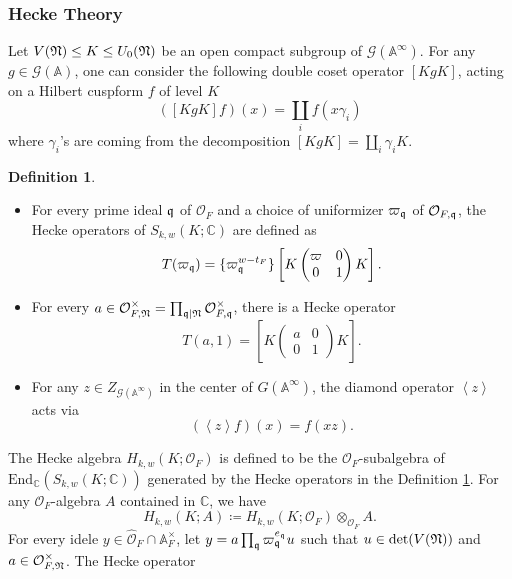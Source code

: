 \documentclass[10pt]{amsart}
\numberwithin{equation}{section}
\theoremstyle{definition}
\newtheorem{defn}[thm]{Definition}
\theoremstyle{remark} %
\newcommand{\bb}{\mathbb}
\newcommand{\mrm}{\mathrm}
\newcommand{\cal}{\mathcal}
\newcommand{\Oo}{\mathcal{O}}
\begin{document}
	\subsubsection{Hecke Theory}
	Let $V(\frak{N}) \le K \le U_0(\frak{N}) $ be an open compact subgroup of $ \cal G(\bb{A}^\infty) $. For any $ g \in \cal G(\bb{A})$, one can consider the following double coset operator $ [KgK] $, acting on a Hilbert cuspform $ f $ of level $ K $ 
	\begin{equation*}
		([KgK]f)(x) = \coprod_i f(x\gamma_i)
	\end{equation*} 
	where $ \gamma_i $'s are coming from the decomposition $ [KgK]=\coprod_i\gamma_iK $.
	\begin{defn}
		\label{defn : Hecke_operator}
		\hfill
		\begin{itemize}
			\item For every prime ideal $ \frak{q} $ of $ \Oo_F $ and a choice of uniformizer $ \varpi_{\frak{q}} $ of $ \Oo_{F,\frak{q}} $, the Hecke operators of $ S_{k,w}(K;\mathbb{C}) $ are defined as $$ T(\varpi_{\frak{q}}) = \{\varpi_{\frak{q}}^{w-t_F}\}\left[K \begin{pmatrix}
				\varpi &0\\
				0 &1
			\end{pmatrix}K \right] . $$  
			\item For every $ a \in \Oo_{F,\frak{N}}^{\times}= \prod_{\frak{q} \mid \frak{N}}\Oo_{F,\frak{q}}^{\times} $, there is a Hecke operator 
			$$ T(a,1)=\left[ K \begin{pmatrix}
				a &0\\
				0 &1
			\end{pmatrix}K \right] .$$
			\item For any $ z \in Z_{\cal G(\bb{A}^\infty)} $ in the center of $ G(\bb{A}^\infty) $, the diamond operator $ \left\langle z \right\rangle  $ acts via 
			$$ ( \left\langle z \right\rangle f)(x)=f(xz) .$$
		\end{itemize}
	\end{defn}
	The Hecke algebra  $ H_{k,w}(K;\Oo_F) $ is defined to be the $ \Oo_F $-subalgebra of $ \mrm{End}_{\bb{C}}\left( S_{k,w}(K;\mathbb{C})\right)  $ generated by the Hecke operators in the Definition \ref{defn : Hecke_operator}. For any $ \Oo_F $-algebra $ A $ contained in $ \bb{C} $, we have $$ H_{k,w}(K;A)\coloneqq H_{k,w}(K;\Oo_F) \otimes_{\Oo_F} A .$$ 
	For every idele $ y \in \widehat{\Oo}_F \cap \bb{A}_F^\times $, let \( y = a \prod_{\frak{q}} \varpi_{\frak{q}}^{e_\frak{q}}u \) such that $ u \in \det(V(\frak{N})) $ and $ a \in \Oo_{F,\frak{N}}^\times $. The Hecke operator 
\end{document}
